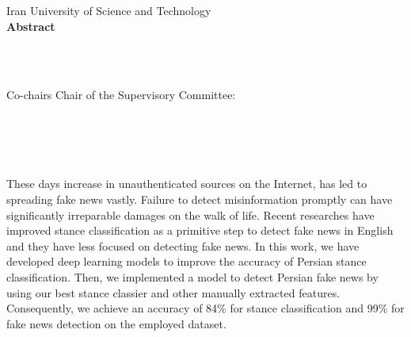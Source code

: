 
\thispagestyle{empty}
\begin{centering}
\vspace{1in}
Iran University of Science and Technology \\
\vspace*{1.\baselineskip}
{\bf Abstract}\\
\vspace*{1\baselineskip}

{\thesisTitle}\\ %
\vspace*{1.\baselineskip}
{\authorName} \\ %
\vspace*{1.\baselineskip}


\ifdefined\secondAdvisor
    Co-chairs
    \else
    Chair
\fi
of the Supervisory Committee:\\ %
\advisorTitle~\advisor\\ \vspace{-.5em} \advisorDepartment \\
\ifdefined\secondAdvisor
    \secondAdvisorTitle~\secondAdvisor\\\vspace{-.5em}\secondAdvisorDepartment \\
\fi
\end{centering}
\vspace*{\baselineskip}
These days increase in unauthenticated sources on the Internet, has led to spreading fake news vastly. 
Failure to detect misinformation promptly can have significantly irreparable damages on the walk of life.
Recent researches have improved stance classification as a primitive step to detect fake news in English and they have less focused on detecting fake news.
In this work, we have developed deep learning models to improve the accuracy of Persian stance classification. 
Then, we implemented a model to detect Persian fake news by using our best stance classier and other manually extracted features. 
Consequently, we achieve an accuracy of 84\% for stance classification and 99\% for fake news detection on the employed dataset.
